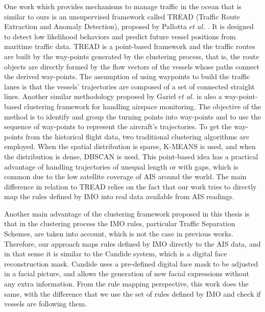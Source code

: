 \documentclass[12pt,glossary]{dalcsthesis}
\begin{document}
One work which provides mechanisms to manage traffic in the ocean that is similar to ours is an unsupervised framework called TREAD (Traffic Route Extraction and Anomaly Detection), proposed by Pallotta $et$ $al$. \cite{PallottaFramework}\cite{vespe12}\cite{pallotta13}. It is designed to detect low likelihood behaviors and predict future vessel positions from maritime traffic data. TREAD is a point-based framework and the traffic routes are built by the way-points generated by the clustering process, that is, the route objects are directly formed by the flow vectors of the vessels whose paths connect the derived way-points. The assumption of using waypoints to build the traffic lanes is that the vessels' trajectories are composed of a set of connected straight lines. Another similar methodology proposed by Gariel $et$ $al$. \cite{airspaceMonitoring} is also a way-point-based clustering framework for handling airspace monitoring. The objective of the method is to identify and group the turning points into way-points and to use the sequence of way-points to represent the aircraft's trajectories. To get the way-points from the historical flight data, two traditional clustering algorithms are employed. When the spatial distribution is sparse, K-MEANS \cite{kmeans} is used, and when the distribution is dense, DBSCAN \cite{DBScan96} is used. This point-based idea has a practical advantage of handling trajectories of unequal length or with gaps, which is common due to the low satellite coverage of AIS around the world. The main difference in relation to TREAD \cite{PallottaFramework} relies on the fact that our work tries to directly map the  rules defined by IMO into real data available from AIS readings.


Another main advantage of the clustering framework proposed in this thesis is that in the clustering process the IMO rules, particular Traffic Separation Schemes, are taken into account, which is not the case in previous works. Therefore, our approach maps rules defined by IMO directly to the AIS data, and in that sense it is similar to the Candide \cite{Candide} system, which is a digital face reconstruction mask. Candide uses a pre-defined digital face mask to be adjusted in a facial picture, and allows the generation of new facial  expressions  without any extra information.  From the rule mapping perspective, this work does the same, with the difference that we use the set of rules defined by IMO and check if vessels are following them.
\end{document}
